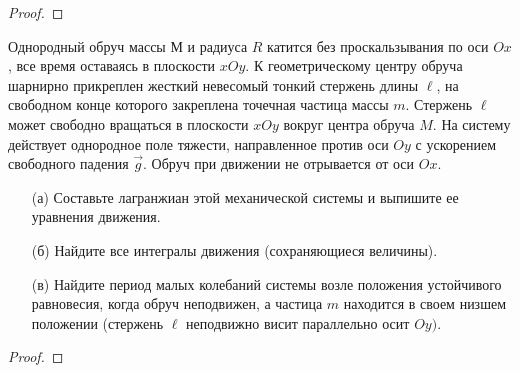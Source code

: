 \begin{proof}

\end{proof}
\vskip 0.6in




\begin{prob}
Однородный обруч массы М и радиуса $R$ катится без проскальзывания по оси $O x$, все время оставаясь в плоскости $x O y$. К геометрическому центру обруча шарнирно прикреплен жесткий невесомый тонкий стержень длины $\ell$, на свободном конце которого закреплена точечная частица массы $m$. Стержень $\ell$ может свободно вращаться в плоскости $x O y$ вокруг центра обруча $M$. На систему действует однородное поле тяжести, направленное против оси $O y$ с ускорением свободного падения $\vec{g}$. Обруч при движении не отрывается от оси $O x$.
\begin{itemize}
\item[]
\item[(а)] Составьте лагранжиан этой механической системы и выпишите ее уравнения движения.
\item[(б)] Найдите все интегралы движения (сохраняющиеся величины).
\item[(в)] Найдите период малых колебаний системы возле положения устойчивого равновесия, когда обруч неподвижен, а частица $m$ находится в своем низшем положении (стержень $\ell$ неподвижно висит параллельно осит $O y)$.
\end{itemize}
\end{prob}

\begin{proof}

\end{proof}